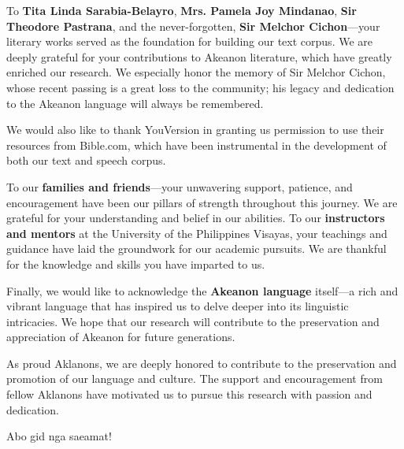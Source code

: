 To \textbf{Tita Linda Sarabia-Belayro}, \textbf{Mrs. Pamela Joy Mindanao}, \textbf{Sir Theodore Pastrana}, and the never-forgotten, \textbf{Sir Melchor Cichon}---your literary works served as the foundation for building our text corpus. We are deeply grateful for your contributions to Akeanon literature, which have greatly enriched our research. We especially honor the memory of Sir Melchor Cichon, whose recent passing is a great loss to the community; his legacy and dedication to the Akeanon language will always be remembered.

We would also like to thank YouVersion in granting us permission to use their resources from Bible.com, which have been instrumental in the development of both our text and speech corpus.

To our \textbf{families and friends}---your unwavering support, patience, and encouragement have been our pillars of strength throughout this journey. We are grateful for your understanding and belief in our abilities. To our \textbf{instructors and mentors} at the University of the Philippines Visayas, your teachings and guidance have laid the groundwork for our academic pursuits. We are thankful for the knowledge and skills you have imparted to us.

Finally, we would like to acknowledge the \textbf{Akeanon language} itself---a rich and vibrant language that has inspired us to delve deeper into its linguistic intricacies. We hope that our research will contribute to the preservation and appreciation of Akeanon for future generations.

As proud Aklanons, we are deeply honored to contribute to the preservation and promotion of our language and culture. The support and encouragement from fellow Aklanons have motivated us to pursue this research with passion and dedication.

Abo gid nga saeamat!